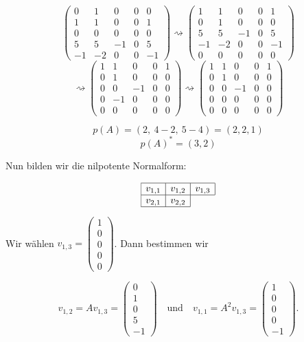 \documentclass[a4paper,12pt]{article}
\begin{document}
\[
\begin{pmatrix}
0 & 1 & 0 & 0 & 0 \\
1 & 1 & 0 & 0 & 1 \\
0 & 0 & 0 & 0 & 0 \\
5 & 5 & -1 & 0 & 5 \\
-1 & -2 & 0 & 0 & -1
\end{pmatrix}
\rightsquigarrow
\begin{pmatrix}
1 & 1 & 0 & 0 & 1 \\
0 & 1 & 0 & 0 & 0 \\
5 & 5 & -1 & 0 & 5 \\
-1 & -2 & 0 & 0 & -1 \\
0 & 0 & 0 & 0 & 0
\end{pmatrix}
\]
\[
\rightsquigarrow
\begin{pmatrix}
1 & 1 & 0 & 0 & 1 \\
0 & 1 & 0 & 0 & 0 \\
0 & 0 & -1 & 0 & 0 \\
0 & -1 & 0 & 0 & 0 \\
0 & 0 & 0 & 0 & 0
\end{pmatrix}
\rightsquigarrow
\begin{pmatrix}
1 & 1 & 0 & 0 & 1 \\
0 & 1 & 0 & 0 & 0 \\
0 & 0 & -1 & 0 & 0 \\
0 & 0 & 0 & 0 & 0 \\
0 & 0 & 0 & 0 & 0
\end{pmatrix}
\]

\[
p(A) = (2,\ 4-2,\ 5-4) = (2,2,1)
\]
\[
p(A)^* = (3,2)
\]

Nun bilden wir die nilpotente Normalform:

\[
\begin{array}{|c|c|c|}
\hline
v_{1,1} & v_{1,2} & v_{1,3} \\
\hline
v_{2,1} & v_{2,2} & \multicolumn{1}{c}{} \\
\cline{1-2}
\end{array}
\]

Wir wählen $v_{1,3} = \begin{pmatrix}1\\0\\0\\0\\0\end{pmatrix}$. Dann bestimmen wir

\[
v_{1,2} = A v_{1,3} = \begin{pmatrix}0\\1\\0\\5\\-1\end{pmatrix}
\quad\text{und}\quad
v_{1,1} = A^2 v_{1,3} = \begin{pmatrix}1\\0\\0\\0\\-1\end{pmatrix}.
\]
\end{document}
